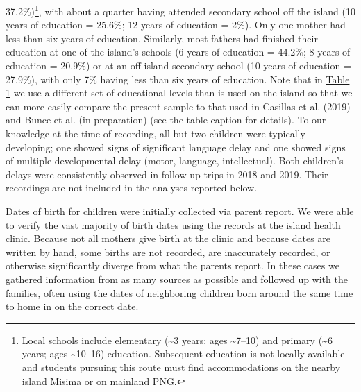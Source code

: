 \documentclass[,man,floatsintext]{apa6}
\let\rmarkdownfootnote\footnote%
\def\footnote{\protect\rmarkdownfootnote}
\begin{document}
37.2\%)\footnote{Local schools include elementary (\textasciitilde{}3
  years; ages \textasciitilde{}7--10) and primary (\textasciitilde{}6
  years; ages \textasciitilde{}10--16) education. Subsequent education
  is not locally available and students pursuing this route must find
  accommodations on the nearby island Misima or on mainland PNG.}, with
about a quarter having attended secondary school off the island (10
years of education = 25.6\%; 12 years of education = 2\%). Only one
mother had less than six years of education. Similarly, most fathers had
finished their education at one of the island's schools (6 years of
education = 44.2\%; 8 years of education = 20.9\%) or at an off-island
secondary school (10 years of education = 27.9\%), with only 7\% having
less than six years of education. Note that in
\protect\hyperlink{tab1}{Table 1} we use a different set of educational
levels than is used on the island so that we can more easily compare the
present sample to that used in Casillas et al. (2019) and Bunce et al.
(in preparation) (see the table caption for details). To our knowledge
at the time of recording, all but two children were typically
developing; one showed signs of significant language delay and one
showed signs of multiple developmental delay (motor, language,
intellectual). Both children's delays were consistently observed in
follow-up trips in 2018 and 2019. Their recordings are not included in
the analyses reported below.

Dates of birth for children were initially collected via parent report.
We were able to verify the vast majority of birth dates using the
records at the island health clinic. Because not all mothers give birth
at the clinic and because dates are written by hand, some births are not
recorded, are inaccurately recorded, or otherwise significantly diverge
from what the parents report. In these cases we gathered information
from as many sources as possible and followed up with the families,
often using the dates of neighboring children born around the same time
to home in on the correct date.
\end{document}
